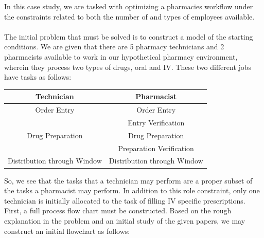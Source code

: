 \documentclass[letterpaper,10pt]{article}
\begin{document}
In this case study, we are tasked with optimizing a pharmacies workflow under the constraints related to both the number of and types of employees available.\\\\
The initial problem that must be solved is to construct a model of the starting conditions. We are given that there are 5 pharmacy technicians and 2 pharmacists available to work in our hypothetical pharmacy environment, wherein they process two types of drugs, oral and IV. These two different jobs have tasks as follows:
\begin{center}
\begin{tabular}{|c|c|}
\hline
Technician & Pharmacist\\\hline\hline
Order Entry & Order Entry \\\hline
& Entry Verification \\\hline
Drug Preparation & Drug Preparation\\\hline
& Preparation Verification\\\hline
Distribution through Window & Distribution through Window\\\hline
\end{tabular}
\end{center}
So, we see that the tasks that a technician may perform are a proper subset of the tasks a pharmacist may perform. In addition to this role constraint, only one technician is initially allocated to the task of filling IV specific prescriptions. First, a full process flow chart must be constructed. Based on the rough explanation in the problem and an initial study of the given papers, we may construct an initial flowchart as follows:
\end{document}
